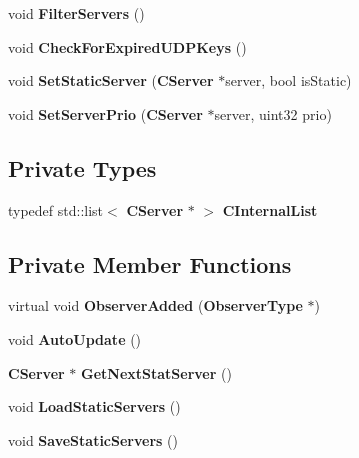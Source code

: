 \begin{DoxyCompactItemize}
\item 
void {\bf FilterServers} ()
\item 
void {\bfseries CheckForExpiredUDPKeys} ()\label{classCServerList_a772ce8ffebfe1f72fa4dfcf7e6d091d0}

\item 
void {\bf SetStaticServer} ({\bf CServer} $\ast$server, bool isStatic)
\item 
void {\bfseries SetServerPrio} ({\bf CServer} $\ast$server, uint32 prio)\label{classCServerList_a0c77a4d3ff7fabda5054be723583d6d6}

\end{DoxyCompactItemize}
\subsection*{Private Types}
\begin{DoxyCompactItemize}
\item 
typedef std::list$<$ {\bf CServer} $\ast$ $>$ {\bfseries CInternalList}\label{classCServerList_a721dc2fba03bfe2fa408fd0c8a41cf35}

\end{DoxyCompactItemize}
\subsection*{Private Member Functions}
\begin{DoxyCompactItemize}
\item 
virtual void {\bf ObserverAdded} ({\bf ObserverType} $\ast$)\label{classCServerList_a3f0fe66b1078b318b730015bde47392b}

\item 
void {\bfseries AutoUpdate} ()\label{classCServerList_a0005ed40179224290c4b9fd96b76b19f}

\item 
{\bf CServer} $\ast$ {\bfseries GetNextStatServer} ()\label{classCServerList_a7e6a8a7090fcde49db741a8b94b33c42}

\item 
void {\bfseries LoadStaticServers} ()\label{classCServerList_a82ddfceb8388a6d7a2dc88e518a9c6c9}

\item 
void {\bfseries SaveStaticServers} ()\label{classCServerList_a47b6d1fb2656edb0279acc84609ed9b5}

\end{DoxyCompactItemize}
